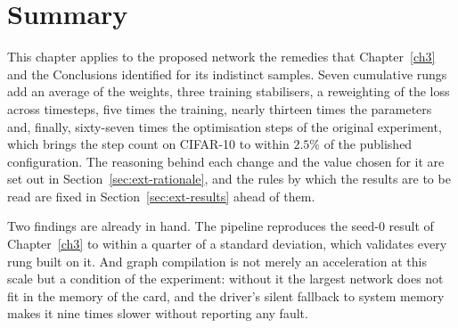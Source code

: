 \section{Summary}

This chapter applies to the proposed network the remedies that Chapter~\ref{ch3} and the Conclusions
identified for its indistinct samples. Seven cumulative rungs add an average of the weights, three
training stabilisers, a reweighting of the loss across timesteps, five times the training, nearly
thirteen times the parameters and, finally, sixty-seven times the optimisation steps of the original
experiment, which brings the step count on CIFAR-10 to within $2.5\%$ of the published configuration.
The reasoning behind each change and the value chosen for it are set out in
Section~\ref{sec:ext-rationale}, and the rules by which the results are to be read are fixed in
Section~\ref{sec:ext-results} ahead of them.

Two findings are already in hand. The pipeline reproduces the seed-0 result of Chapter~\ref{ch3}
to within a quarter of a standard deviation, which validates every rung built on it. And graph
compilation is not merely an acceleration at this scale but a condition of the experiment: without
it the largest network does not fit in the memory of the card, and the driver's silent fallback to
system memory makes it nine times slower without reporting any fault.
